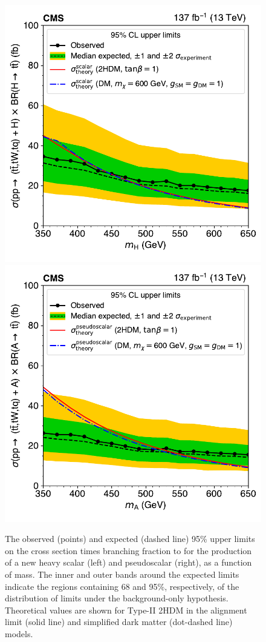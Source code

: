 \begin{figure}[!hbtp]
\centering
    \includegraphics[width=.49\textwidth]{figs/ftp/ft_higgs_sc_scan_limit.pdf}
    \includegraphics[width=.49\textwidth]{figs/ftp/ft_higgs_ps_scan_limit.pdf}
\caption{
    The observed (points) and expected (dashed line) 95\% \CL upper limits on the cross section
    times branching fraction to \ttbar for the production of a new heavy scalar \PH (left) and pseudoscalar \PSA (right),
    as a function of mass. The inner and outer bands around the expected limits indicate the regions containing 68 and 95\%,
    respectively, of the distribution of limits under the background-only hypothesis. Theoretical values are shown for Type-II 2HDM
    in the alignment limit (solid line) and simplified dark matter (dot-dashed line) models.
}
\label{fig:HiggsLimits}
\end{figure}

